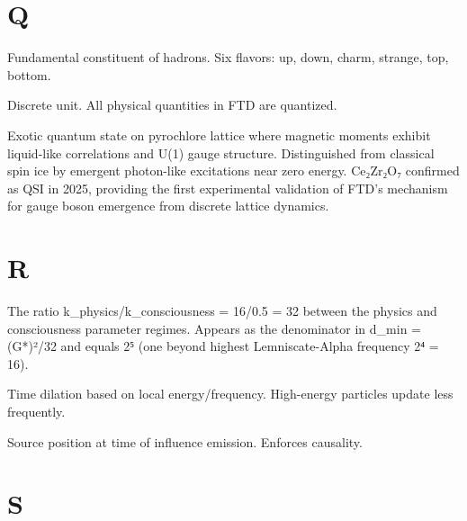 \documentclass[
  11pt,
  letterpaper,
  twoside,
  openany]{book}
\makeatletter
\providecommand{\tightlist}{%
  \setlength{\itemsep}{0pt}\setlength{\parskip}{0pt}}
\let\orig@section\section
\renewcommand{\section}{\needspace{8\baselineskip}\orig@section}
\makeatother
\begin{document}
\section{Q}\label{q}

\begin{description}
\tightlist
\item[\textbf{Quark}]
Fundamental constituent of hadrons. Six flavors: up, down, charm,
strange, top, bottom.
\item[\textbf{Quantum}]
Discrete unit. All physical quantities in FTD are quantized.
\item[\textbf{Quantum Spin Ice (QSI)}]
Exotic quantum state on pyrochlore lattice where magnetic moments
exhibit liquid-like correlations and U(1) gauge structure. Distinguished
from classical spin ice by emergent photon-like excitations near zero
energy. Ce₂Zr₂O₇ confirmed as QSI in 2025, providing the first
experimental validation of FTD's mechanism for gauge boson emergence
from discrete lattice dynamics.
\end{description}

\section{R}\label{r}

\begin{description}
\tightlist
\item[\textbf{Regime Ratio (32)}]
The ratio k\_physics/k\_consciousness = 16/0.5 = 32 between the physics
and consciousness parameter regimes. Appears as the denominator in
d\_min = (G*)²/32 and equals 2⁵ (one beyond highest Lemniscate-Alpha
frequency 2⁴ = 16).
\item[\textbf{Relativity}]
Time dilation based on local energy/frequency. High-energy particles
update less frequently.
\item[\textbf{Retarded Position}]
Source position at time of influence emission. Enforces causality.
\end{description}

\section{S}\label{s}
\end{document}
